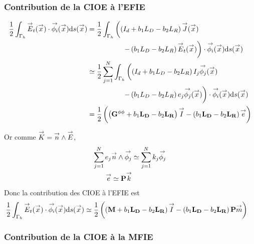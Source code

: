     \subsubsection{Contribution de la CIOE à l'EFIE}

      \begin{equation}
        \begin{aligned}
          \frac{1}{2} \int_{\Gamma_h} \vE_t(\vx) \cdot \phii(\vx) \dd{s}(\vx)
          &= \frac{1}{2} \int_{\Gamma_h}  \left( \left(I_d + b_1 L_D - b_2 L_R\right) \vJ (\vx)\right.
          \\
          & \hspace{5em} \left.  - \left( b_1 L_D - b_2 L_R\right) \vE_t (\vx) \right) \cdot \phii(\vx) \dd{s}(\vx)
          \\
          & \simeq \frac{1}{2} \sum_{j=1}^N \int_{\Gamma_h} \left( \left(I_d + b_1 L_D - b_2 L_R\right) I_j \phij (\vx)\right.
          \\
          & \hspace{5em} \left.  - \left( b_1 L_D - b_2 L_R\right) e_j \phij (\vx) \right) \cdot \phii(\vx) \dd{s}(\vx)
          \\
          & = \frac{1}{2} \left( \left(\mG{\phi}{\phi} + b_1 \mLD - b_2 \mLR\right) \vect{I}  - \left( b_1 \mLD - b_2 \mLR\right) \vect{e}\right)
        \end{aligned}
      \end{equation}

      Or comme \(\vK = \vn \pvect \vE\),
      \begin{equation}
        \begin{aligned}
        \sum_{j=1}^N e_j \vn \pvect \phij & \simeq \sum_{j=1}^N k_j \phij
        \\
        \vect{e} \simeq \mPP \vect{k}
        \end{aligned}
      \end{equation}
      Donc la contribution des CIOE à l'EFIE est
      \begin{equation}
        \begin{aligned}
          \frac{1}{2} \int_{\Gamma_h} \vE_t(\vx) \cdot \phii(\vx) \dd{s}(\vx)
          & \simeq \frac{1}{2} \left( \left(\mM + b_1 \mLD - b_2 \mLR\right) \vect{I}  - \left( b_1 \mLD - b_2 \mLR\right) \mPP \vect{m}\right)
        \end{aligned}
      \end{equation}

    \subsubsection{Contribution de la CIOE à la MFIE}


